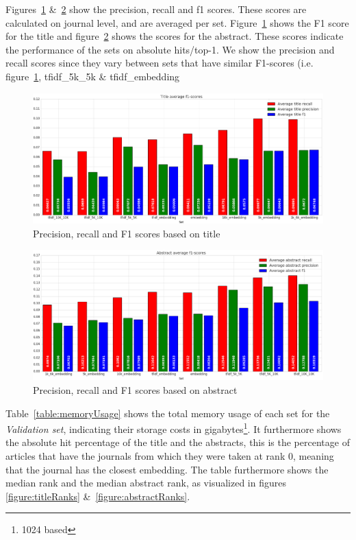 \documentclass[../../Thesis.tex]{subfiles}
\begin{document}
\clearpage
{}
Figures~\ref{figure:f1Title} \&~\ref{figure:f1Abstract} show the precision, recall and f1 scores. These scores are calculated on journal level, and are averaged per set. Figure~\ref{figure:f1Title} shows the F1 score for the title and figure~\ref{figure:f1Abstract} shows the scores for the abstract. These scores indicate the performance of the sets on absolute hits/top-1. We show the precision and recall scores since they vary between sets that have similar F1-scores (i.e. figure~\ref{figure:f1Title}, tfidf\_5k\_5k \& tfidf\_embedding
\begin{figure}[hbt]
\includegraphics[width=6.5in]{Plots/Title_avg_f1}
\caption{Precision, recall and F1 scores based on title}\label{figure:f1Title}
\end{figure}
\begin{figure}[htb]
\includegraphics[width=6.5in]{Plots/Abstract_avg_f1}
\caption{Precision, recall and F1 scores based on abstract}\label{figure:f1Abstract}
\end{figure}
\clearpage
{}
Table~\ref{table:memoryUsage} shows the total memory usage of each set for the \textit{Validation set}, indicating their storage costs in gigabytes\footnote{1024 based}. It furthermore shows the absolute hit percentage of the title and the abstracts, this is the percentage of articles that have the journals from which they were taken at rank 0, meaning that the journal has the closest embedding. The table furthermore shows the median rank and the median abstract rank, as visualized in figures \ref{figure:titleRanks} \&~\ref{figure:abstractRanks}.\\
\end{document}
